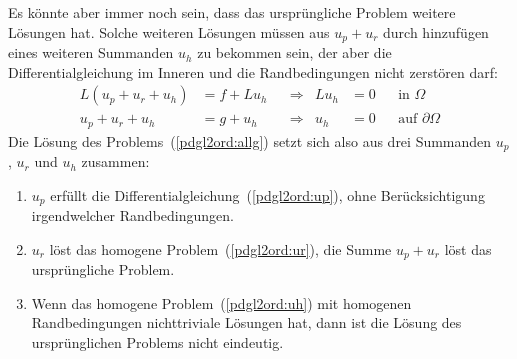 Es könnte aber immer noch sein, dass das ursprüngliche Problem weitere
Lösungen hat.
Solche weiteren Lösungen müssen aus $u_p+u_r$ durch hinzufügen eines
weiteren Summanden $u_h$ zu bekommen sein, der aber die Differentialgleichung
im Inneren und die Randbedingungen nicht zerstören darf:
\begin{equation}
\begin{aligned}
L(u_p+u_r+u_h)&=f+Lu_h&&\Rightarrow&Lu_h&=0&&\text{in $\Omega$}\\
  u_p+u_r+u_h &=g +u_h&&\Rightarrow& u_h&=0&&\text{auf $\partial\Omega$}
\end{aligned}
\label{pdgl2ord:uh}
\end{equation}
Die Lösung des Problems~(\ref{pdgl2ord:allg}) setzt sich also aus
drei Summanden $u_p$, $u_r$ und $u_h$ zusammen:
\begin{enumerate}
\item $u_p$ erfüllt die Differentialgleichung~(\ref{pdgl2ord:up}), ohne
Berücksichtigung irgendwelcher Randbedingungen.
\item $u_r$ löst das homogene Problem~(\ref{pdgl2ord:ur}), die Summe
$u_p+u_r$ löst das ursprüngliche Problem.
\item Wenn das homogene Problem~(\ref{pdgl2ord:uh}) mit homogenen
Randbedingungen nichttriviale Lösungen hat, dann ist die Lösung
des ursprünglichen Problems nicht eindeutig.
\end{enumerate}


